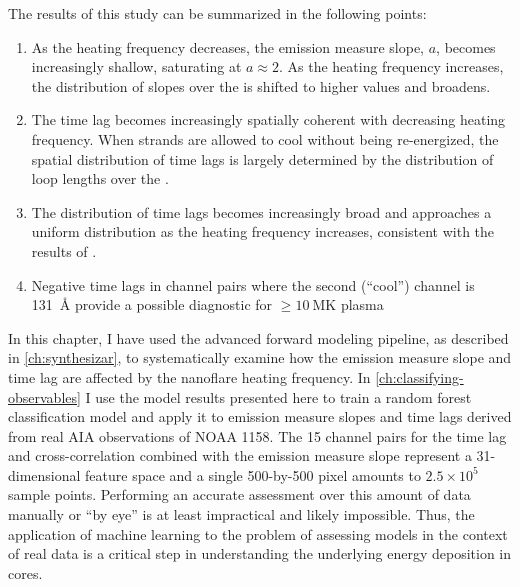 The results of this study can be summarized in the following points:
\begin{enumerate}
    \item As the heating frequency decreases, the emission measure slope, $a$, becomes increasingly shallow, saturating at $a\approx2$. As the heating frequency increases, the distribution of slopes over the \AR{} is shifted to higher values and broadens.
    \item The time lag becomes increasingly spatially coherent with decreasing heating frequency. When strands are allowed to cool without being re-energized, the spatial distribution of time lags is largely determined by the distribution of loop lengths over the \AR{}.
    \item The distribution of time lags becomes increasingly broad and approaches a uniform distribution as the heating frequency increases, consistent with the results of \citet{viall_signatures_2016}.
    \item Negative time lags in channel pairs where the second (``cool'') channel is \SI{131}{\angstrom} provide a possible diagnostic for $\ge\SI{10}{\mega\kelvin}$ plasma
\end{enumerate}

In this chapter, I have used the advanced forward modeling pipeline, as described in \autoref{ch:synthesizar}, to systematically examine how the emission measure slope and time lag are affected by the nanoflare heating frequency. In \autoref{ch:classifying-observables} I use the model results presented here to train a random forest classification model and apply it to emission measure slopes and time lags derived from real AIA observations of NOAA 1158. The 15 channel pairs for the time lag and cross-correlation combined with the emission measure slope represent a 31-dimensional feature space and a single 500-by-500 pixel \AR{} amounts to $2.5\times10^5$ sample points. Performing an accurate assessment over this amount of data manually or ``by eye'' is at least impractical and likely impossible. Thus, the application of machine learning to the problem of assessing models in the context of real data is a critical step in understanding the underlying energy deposition in \AR{} cores. 
